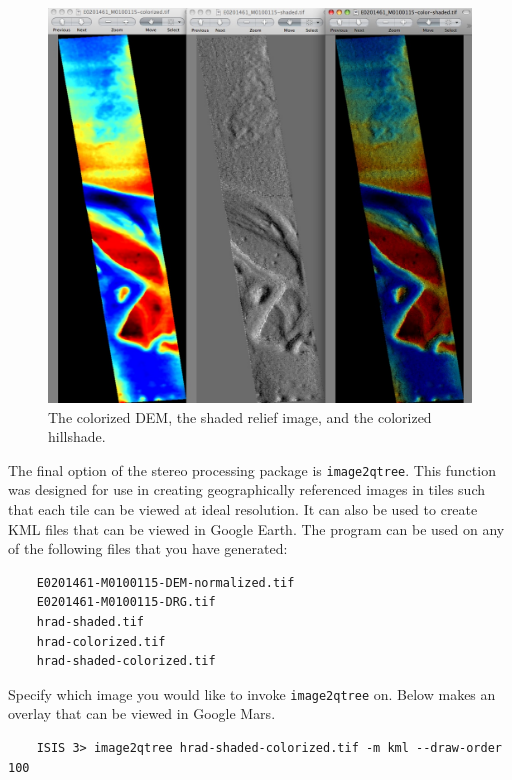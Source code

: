 \begin{figure}
\begin{center}
\includegraphics[width=5in]{images/p19-colorized-shaded.png}
\caption[Hrad colorized and shaded relief]{
    \label{hrad-color}
	The colorized DEM, the shaded relief image, and the colorized hillshade.
    }
\end{center}
\end{figure}

The final option of the stereo processing package is
\texttt{image2qtree}.  This function was designed for use in creating
geographically referenced images in tiles such that each tile can be
viewed at ideal resolution. It can also be used to create KML files
that can be viewed in Google Earth. The program can be used on any of
the following files that you have generated:
\begin{verbatim}
    E0201461-M0100115-DEM-normalized.tif
    E0201461-M0100115-DRG.tif
    hrad-shaded.tif
    hrad-colorized.tif
    hrad-shaded-colorized.tif
\end{verbatim}

Specify which image you would like to invoke \texttt{image2qtree}
on. Below makes an overlay that can be viewed in Google Mars.

\begin{verbatim}
    ISIS 3> image2qtree hrad-shaded-colorized.tif -m kml --draw-order 100
\end{verbatim}

